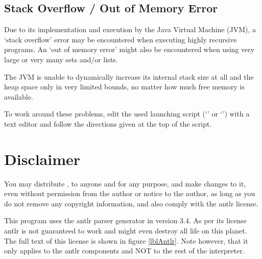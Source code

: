 \subsection{Stack Overflow \slash{} Out of Memory Error}

Due to its implementation and execution by the Java Virtual Machine (JVM), a `stack overflow' error may be encountered when executing highly recursive \SetlX{} programs. An `out of memory error' might also be encountered when using very large or very many sets and\slash{}or lists.

The JVM is unable to dynamically increase its internal stack size at all and the heap space only in very limited bounds, no matter how much free memory is available.

To work around these problems, edit the used launching script (`' or `') with a text editor and follow the directions given at the top of the script.

%


\section{Disclaimer}
You may distribute \setlX{}, to anyone and for any purpose, and make changes to it, even without permission from the author or notice to the author, as long as you do not remove any copyright information, and also comply with the antlr license.

This program uses the antlr parser generator in version 3.4. As per its license antlr is not guaranteed to work and might even destroy all life on this planet. The full text of this license is shown in figure \ref{lblAntlr}. Note however, that it only applies to the antlr components and NOT to the rest of the interpreter.




